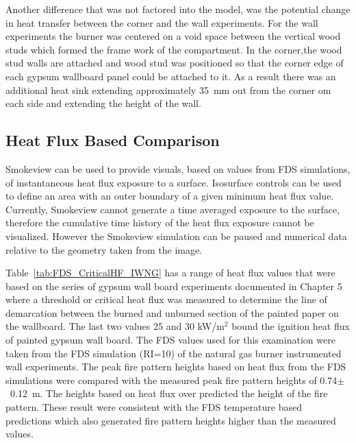 \documentclass[twoside]{uocthesis}
\begin{document}
{Another difference that was not factored into the model, was the potential change in heat transfer between the corner and the wall experiments.  For the wall experiments the burner was centered on a void space between the vertical wood studs which formed the frame work of the compartment.  In the corner,the wood stud walls are attached and wood stud was positioned so that the corner edge of each gypsum wallboard panel could be attached to it.  As a result there was an additional heat sink extending approximately 35~mm out from the corner om each side and extending the height of the wall.

\subsection{Heat Flux Based Comparison}

Smokeview can be used to provide visuals, based on values from FDS simulations, of instantaneous heat flux exposure to a surface.  Isosurface controls can be used to define an area with an outer boundary of a given minimum heat flux value.  Currently, Smokeview cannot generate a time averaged exposure to the surface, therefore the cumulative time history of the heat flux exposure cannot be visualized.  However the Smokeview simulation can be paused and numerical data relative to the geometry taken from the image.

Table~\ref{tab:FDS_CriticalHF_IWNG} has a range of heat flux values that were based on the series of gypsum wall board experiments documented in Chapter 5 where a threshold or critical heat flux was measured to determine the line of demarcation between the burned and unburned section of the painted paper on the wallboard. The last two values 25 and 30 kW/m$^2$ bound the ignition heat flux of painted gypsum wall board.  The FDS values used for this examination were taken from the FDS simulation (RI=10) of the natural gas burner instrumented wall experiments.  The peak fire pattern heights based on heat flux from the FDS simulations were compared with the measured peak fire pattern heights of 0.74$\pm$~0.12~m.  The heights based on heat flux over predicted the height of the fire pattern.  These result were consistent with the FDS temperature based predictions which also generated fire pattern heights higher than the measured values. 

}
\end{document}
